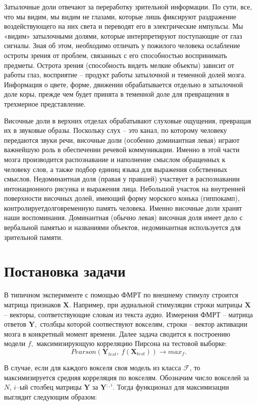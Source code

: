 \documentclass[pdftex,ptm,12pt,a4paper]{report}
\theoremstyle{definition}
\begin{document}
Затылочные доли отвечают за переработку зрительной информации. По сути, все, что мы видим, мы видим не глазами, которые лишь фиксируют раздражение воздействующего на них света и переводят его в электрические импульсы. Мы «видим» затылочными долями, которые интерпретируют поступающие от глаз сигналы. Зная об этом, необходимо отличать у пожилого человека ослабление остроты зрения от проблем, связанных с его способностью воспринимать предметы. Острота зрения (способность видеть мелкие объекты) зависит от работы глаз, восприятие – продукт работы затылочной и теменной долей мозга. Информация о цвете, форме, движении обрабатывается отдельно в затылочной доле коры, прежде чем будет принята в теменной доле для превращения в трехмерное представление. 

Височные доли в верхних отделах обрабатывают слуховые ощущения, превращая их в звуковые образы. Поскольку слух – это канал, по которому человеку передаются звуки речи, височные доли (особенно доминантная левая) играют важнейшую роль в обеспечении речевой коммуникации.
Именно в этой части мозга производится распознавание и наполнение смыслом обращенных к человеку слов, а также подбор единиц языка для выражения собственных смыслов. Недоминантная доля (правая у правшей) участвует в распознавании интонационного рисунка и выражения лица. 
Небольшой участок на внутренней поверхности височных долей, имеющий форму морского конька (гиппокамп), контролируетдолговременную память человека. Именно височные доли хранят наши воспоминания. Доминантная (обычно левая) височная доля имеет дело с вербальной памятью и названиями объектов, недоминантная используется для зрительной памяти.

\chapter{Постановка задачи}

В типичном эксперименте с помощью ФМРТ по внешнему стимулу строится матрица признаков $\textbf{X}.$ Например, при аудиальной стимуляции строки матрицы $\textbf{X}$ -- векторы, соответствующие словам из текста аудио. Измерения ФМРТ -- матрица ответов $\textbf{Y},$ столбцы которой соотвествуют вокселям, строки -- вектор активации мозга в конкретный момент времени. Далее задача сводится к построению модели $f,$ максимизирующую корреляцию Пирсона на тестовой выборке:
$$Pearson(\textbf{Y}_{test},\ f(\textbf{X}_{test})) \rightarrow max_{f}.$$

В случае, если для каждого вокселя своя модель из класса $\mathcal{F}$, то максимизируется средняя корреляция по вокселям. Обозначим число вокселей за $N$, $i$--ый столбец матрицы $\textbf{Y}$ за $\textbf{Y}^{;,i}$. Тогда функционал для максимизации выглядит следующим образом:
\end{document}
